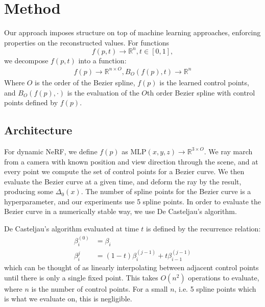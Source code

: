 \section*{Method}

Our approach imposes structure on top of machine learning
approaches, enforcing properties on the reconstructed values. For functions \[ f(p, t)\to\mathbb{R}^n, t\in[0,1], \] we decompose $f(p,t)$ into a function: 
\begin{align}
    f(p)\to\mathbb{R}^{n\times O}, B_O(f(p), t)\to\mathbb{R}^n
\end{align}
Where
$O$ is the order of the Bezier spline, $f(p)$ is the learned control points, and $B_O(f(p), \cdot)$ is the evaluation
of the $O$th order Bezier spline with control points defined by $f(p)$.

\subsection*{Architecture}

For dynamic NeRF, we define $f(p)$ as
$\text{MLP}(x,y,z)\to\mathbb{R}^{3\times O}$. We ray march from a camera with known position and
view direction through the scene, and at every point we compute the set of control points for a Bezier curve. We then evaluate the Bezier curve at a given time, and deform the ray by the result, producing some $\Delta_0(x)$. The number of spline points for the Bezier curve is a  hyperparameter, and our experiments use 5 spline points. In order to evaluate the Bezier curve in a numerically stable way, we use De Casteljau's algorithm. 

De Casteljau's algorithm evaluated at time $t$ is defined by the recurrence relation:
\begin{align}
  \beta_i^{(0)} &= \beta_i \nonumber \\
  \beta_i^{j} &= (1-t)\beta_i^{(j-1)} + t\beta_{i-1}^{(j-1)}
\end{align}
which can be thought of as linearly interpolating between adjacent control points until there is only a single fixed point. This takes $O(n^2)$ operations to evaluate, where $n$ is the number of control points. For a small $n$, i.e. 5 spline points which is what we evaluate on, this is negligible.

